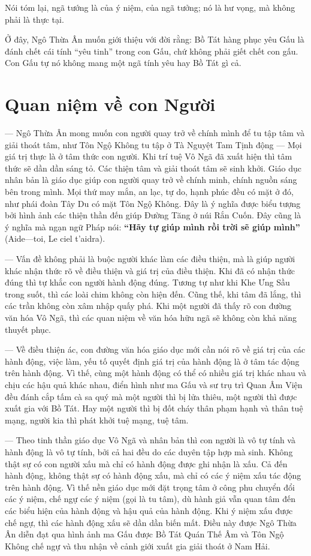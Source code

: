 Nói tóm lại, ngã tướng là của ý niệm, của ngã tưởng; nó là hư vọng, mà không phải là thực tại.

Ở đây, Ngô Thừa Ân muốn giới thiệu với đời rằng: Bồ Tát hàng phục yêu Gấu là đánh chết cái tính ``yêu tinh'' trong con Gấu, chứ không phải giết chết con gấu. Con Gấu tự nó không mang một ngã tính yêu hay Bồ Tát gì cả.


\section{Quan niệm về con Người} %
\label{sec:15_con_nguoi}

--- Ngô Thừa Ân mong muốn con người quay trở về chính mình để tu tập tâm và giải thoát tâm, như Tôn Ngộ Không tu tập ở Tà Nguyệt Tam Tịnh động --- Mọi giá trị thực là ở tâm thức con người. Khi trí tuệ Vô Ngã đã xuất hiện thì tâm thức sẽ dần dần sáng tỏ. Các thiện tâm và giải thoát tâm sẽ sinh khởi. Giáo dục nhân bản là giáo dục giúp con người quay trở về chính minh, chính nguồn sáng bên trong mình. Mọi thứ may mắn, an lạc, tự do, hạnh phúc đều có mặt ở đó, như phái đoàn Tây Du có mặt Tôn Ngộ Không. Đây là ý nghĩa được biểu tượng bởi hình ảnh các thiện thần đến giúp Đường Tăng ở núi Rắn Cuốn. Đây cũng là ý nghĩa mà ngạn ngữ Pháp nói: {\bf ``Hãy tự giúp mình rồi trời sẽ giúp mình''} (Aide---toi, Le ciel t'aidra).

--- Vấn đề không phải là buộc người khác làm các điều thiện, mà là giúp người khác nhận thức rõ về điều thiện và giá trị của điều thiện. Khi đã có nhận thức đúng thì tự khắc con người hành động đúng. Tương tự như khi Khe Ưng Sầu trong suốt, thì các loài chim không còn hiện đến. Cũng thế, khi tâm đã lắng, thì các trần không còn xâm nhập quấy phá. Khi một người đã thấy rõ con đường văn hóa Vô Ngã, thì các quan niệm về văn hóa hữu ngã sẽ không còn khả năng thuyết phục.

--- Về điều thiện ác, con đường văn hóa giáo dục mới cần nói rõ về giá trị của các hành động, việc làm, yếu tố quyết định giá trị của hành động là ở tâm tác động trên hành động. Vì thế, cùng một hành động có thể có nhiều giá trị khác nhau và chịu các hậu quả khác nhau, điển hình như ma Gấu và sư trụ trì Quan Âm Viện đều đánh cắp tấm cà sa quý mà một người thì bị lửa thiêu, một người thì được xuất gia với Bồ Tát. Hay một người thì bị đốt cháy thân phạm hạnh và thân tuệ mạng, người kia thì phát khởi tuệ mạng, tuệ tâm.

--- Theo tinh thần giáo dục Vô Ngã và nhân bản thì con người là vô tự tính và hành động là vô tự tính, bởi cả hai đều do các duyên tập hợp mà sinh. Không thật sự có con người xấu mà chỉ có hành động được ghi nhận là xấu. Cả đến hành động, không thật sự có hành động xấu, mà chỉ có các ý niệm xấu tác động trên hành động. Vì thế nền giáo dục mới đặt trọng tâm ở công phu chuyển đổi các ý niệm, chế ngự các ý niệm (gọi là tu tâm), dù hành giả vẫn quan tâm đến các biểu hiện của hành động và hậu quả của hành động. Khi ý niệm xấu được chế ngự, thì các hành động xấu sẽ dần dần biến mất. Điều này được Ngô Thừa Ân diễn đạt qua hình ảnh ma Gấu được Bồ Tát Quán Thế Âm và Tôn Ngộ Không chế ngự và thu nhận về cảnh giới xuất gia giải thoát ở Nam Hải.


